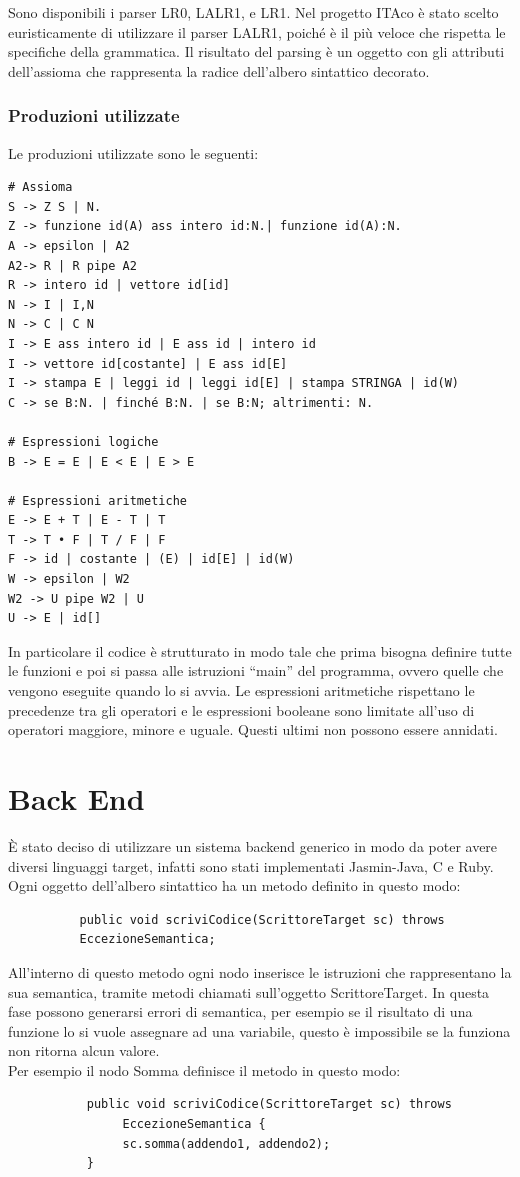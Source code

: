 \documentclass[11pt, a4paper, twoside, notitlepage]{report}
\begin{document}
Sono disponibili i parser LR0, LALR1, e LR1. Nel progetto ITAco è stato scelto
euristicamente di utilizzare il parser LALR1, poiché è il più veloce che
rispetta le specifiche della grammatica. Il risultato del parsing è un oggetto
con gli attributi dell'assioma che rappresenta la radice dell'albero sintattico
decorato.
\subsection{Produzioni utilizzate}
Le produzioni utilizzate sono le seguenti:
\begin{verbatim}
# Assioma
S -> Z S | N.
Z -> funzione id(A) ass intero id:N.| funzione id(A):N.
A -> epsilon | A2
A2-> R | R pipe A2 
R -> intero id | vettore id[id]
N -> I | I,N
N -> C | C N
I -> E ass intero id | E ass id | intero id
I -> vettore id[costante] | E ass id[E]
I -> stampa E | leggi id | leggi id[E] | stampa STRINGA | id(W)
C -> se B:N. | finché B:N. | se B:N; altrimenti: N.

# Espressioni logiche
B -> E = E | E < E | E > E

# Espressioni aritmetiche
E -> E + T | E - T | T
T -> T • F | T / F | F
F -> id | costante | (E) | id[E] | id(W)
W -> epsilon | W2
W2 -> U pipe W2 | U
U -> E | id[]
\end{verbatim}

In particolare il codice è strutturato in modo tale che prima bisogna definire
tutte le funzioni e poi si passa alle istruzioni ``main'' del programma, ovvero
quelle che vengono eseguite quando lo si avvia. Le espressioni aritmetiche
rispettano le precedenze tra gli operatori e le espressioni booleane sono
limitate all'uso di operatori maggiore, minore e uguale. Questi ultimi non
possono essere annidati.
\chapter{Back End}
\label{back_end}
È stato deciso di utilizzare un sistema backend generico in modo da poter avere
diversi linguaggi target, infatti sono stati implementati Jasmin-Java, C e Ruby.
Ogni oggetto dell'albero sintattico ha un metodo definito in questo modo:

\begin{verbatim}
          public void scriviCodice(ScrittoreTarget sc) throws
          EccezioneSemantica;
\end{verbatim}

All'interno di questo metodo ogni nodo inserisce le istruzioni che rappresentano
la sua semantica, tramite metodi chiamati sull'oggetto ScrittoreTarget. In
questa fase possono generarsi errori di semantica, per esempio se il
risultato di una funzione lo si vuole assegnare ad una variabile, questo è
impossibile se la funziona non ritorna alcun valore.
\\Per esempio il nodo Somma definisce il metodo in questo modo:
\begin{verbatim}
           public void scriviCodice(ScrittoreTarget sc) throws
                EccezioneSemantica {
                sc.somma(addendo1, addendo2);
           }
\end{verbatim}
\end{document}
